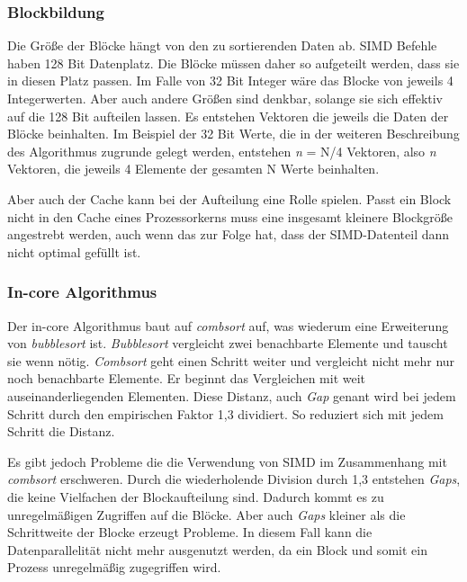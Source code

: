 \subsubsection*{Blockbildung}
\label{sec:AA-Sort_Blockbildung}

Die Größe der Blöcke hängt von den zu sortierenden Daten ab. SIMD Befehle haben 128 Bit Datenplatz. Die Blöcke müssen daher so aufgeteilt werden, dass sie in diesen Platz passen. Im Falle von 32 Bit Integer wäre das Blocke von jeweils 4 Integerwerten. Aber auch andere Größen sind denkbar, solange sie sich effektiv auf die 128 Bit aufteilen lassen. Es entstehen Vektoren die jeweils die Daten der Blöcke beinhalten. Im Beispiel der 32 Bit Werte, die in der weiteren Beschreibung des Algorithmus zugrunde gelegt werden, entstehen \textit{n} = N/4 Vektoren, also \textit{n} Vektoren, die jeweils 4 Elemente der gesamten N Werte beinhalten.

Aber auch der Cache kann bei der Aufteilung eine Rolle spielen. Passt ein Block nicht in den Cache eines Prozessorkerns muss eine insgesamt kleinere Blockgröße angestrebt werden, auch wenn das zur Folge hat, dass der SIMD-Datenteil dann nicht optimal gefüllt ist.

\subsubsection*{In-core Algorithmus}
\label{sec:AA-Sort_In_Core}

Der in-core Algorithmus baut auf \textit{combsort} auf, was wiederum eine Erweiterung von \textit{bubblesort} ist. \textit{Bubblesort} vergleicht zwei benachbarte Elemente und tauscht sie wenn nötig. \textit{Combsort} geht einen Schritt weiter und vergleicht nicht mehr nur noch benachbarte Elemente. Er beginnt das Vergleichen mit weit auseinanderliegenden Elementen. Diese Distanz, auch \textit{Gap} genant wird bei jedem Schritt durch den empirischen Faktor 1,3 dividiert. So reduziert sich mit jedem Schritt die Distanz.

Es gibt jedoch Probleme die die Verwendung von SIMD im Zusammenhang mit \textit{combsort} erschweren. Durch die wiederholende Division durch 1,3 entstehen \textit{Gaps}, die keine Vielfachen der Blockaufteilung sind. Dadurch kommt es zu unregelmäßigen Zugriffen auf die Blöcke. Aber auch \textit{Gaps} kleiner als die Schrittweite der Blocke erzeugt Probleme. In diesem Fall kann die Datenparallelität nicht mehr ausgenutzt werden, da ein Block und somit ein Prozess unregelmäßig zugegriffen wird.

